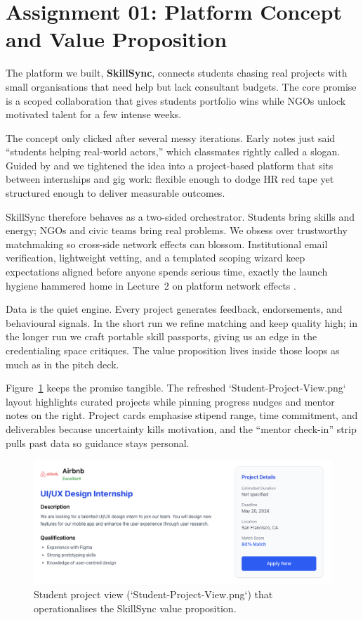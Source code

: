 \section*{Assignment 01: Platform Concept and Value Proposition}

The platform we built, \textbf{SkillSync}, connects students chasing real projects with small organisations that need help but lack consultant budgets. The core promise is a scoped collaboration that gives students portfolio wins while NGOs unlock motivated talent for a few intense weeks.

The concept only clicked after several messy iterations. Early notes just said ``students helping real-world actors,'' which classmates rightly called a slogan. Guided by \citet{Choudary2016} and \citet{Srnicek2017} we tightened the idea into a project-based platform that sits between internships and gig work: flexible enough to dodge HR red tape yet structured enough to deliver measurable outcomes.

SkillSync therefore behaves as a two-sided orchestrator. Students bring skills and energy; NGOs and civic teams bring real problems. We obsess over trustworthy matchmaking so cross-side network effects can blossom. Institutional email verification, lightweight vetting, and a templated scoping wizard keep expectations aligned before anyone spends serious time, exactly the launch hygiene hammered home in Lecture~2 on platform network effects \citep{Lecture02}.

Data is the quiet engine. Every project generates feedback, endorsements, and behavioural signals. In the short run we refine matching and keep quality high; in the longer run we craft portable skill passports, giving us an edge in the credentialing space \citet{Zuboff2019} critiques. The value proposition lives inside those loops as much as in the pitch deck.

Figure~\ref{fig:student-view} keeps the promise tangible. The refreshed `Student-Project-View.png` layout highlights curated projects while pinning progress nudges and mentor notes on the right. Project cards emphasise stipend range, time commitment, and deliverables because uncertainty kills motivation, and the ``mentor check-in'' strip pulls past data so guidance stays personal.

\begin{figure}[h]
  \centering
  \includegraphics[width=0.85\linewidth]{figures/Student-Project-View.png}
  \caption{Student project view (`Student-Project-View.png`) that operationalises the SkillSync value proposition.}
  \label{fig:student-view}
\end{figure}

